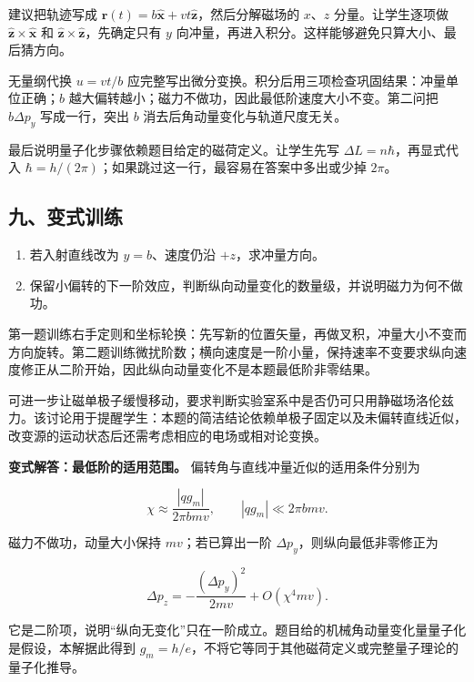 \documentclass[12pt,a4paper,UTF8]{ctexart}
\newcommand{\tightlist}{\setlength{\itemsep}{0pt}\setlength{\parskip}{0pt}}
\begin{document}
建议把轨迹写成
\(\boldsymbol r(t)=b\hat{\boldsymbol x}+vt\hat{\boldsymbol z}\)，然后分解磁场的
\(x\)、\(z\) 分量。让学生逐项做
\(\hat{\boldsymbol z}\times\hat{\boldsymbol x}\) 和
\(\hat{\boldsymbol z}\times\hat{\boldsymbol z}\)，先确定只有 \(y\)
向冲量，再进入积分。这样能够避免只算大小、最后猜方向。

无量纲代换 \(u=vt/b\)
应完整写出微分变换。积分后用三项检查巩固结果：冲量单位正确；\(b\)
越大偏转越小；磁力不做功，因此最低阶速度大小不变。第二问把
\(b\Delta p_y\) 写成一行，突出 \(b\) 消去后角动量变化与轨道尺度无关。

最后说明量子化步骤依赖题目给定的磁荷定义。让学生先写
\(\Delta L=n\hbar\)，再显式代入
\(\hbar=h/(2\pi)\)；如果跳过这一行，最容易在答案中多出或少掉 \(2\pi\)。

\subsection{九、变式训练}\label{ux4e5dux53d8ux5f0fux8badux7ec3-7}

\begin{enumerate}
\def\labelenumi{\arabic{enumi}.}
\tightlist
\item
  若入射直线改为 \(y=b\)、速度仍沿 \(+z\)，求冲量方向。
\item
  保留小偏转的下一阶效应，判断纵向动量变化的数量级，并说明磁力为何不做功。
\end{enumerate}

第一题训练右手定则和坐标轮换：先写新的位置矢量，再做叉积，冲量大小不变而方向旋转。第二题训练微扰阶数；横向速度是一阶小量，保持速率不变要求纵向速度修正从二阶开始，因此纵向动量变化不是本题最低阶非零结果。

可进一步让磁单极子缓慢移动，要求判断实验室系中是否仍可只用静磁场洛伦兹力。该讨论用于提醒学生：本题的简洁结论依赖单极子固定以及未偏转直线近似，改变源的运动状态后还需考虑相应的电场或相对论变换。

\textbf{变式解答：最低阶的适用范围。}
偏转角与直线冲量近似的适用条件分别为

\[\chi\approx\frac{|qg_m|}{2\pi bmv},\qquad |qg_m|\ll2\pi bmv.\]

磁力不做功，动量大小保持 \(mv\)；若已算出一阶
\(\Delta p_y\)，则纵向最低非零修正为

\[\Delta p_z=-\frac{(\Delta p_y)^2}{2mv}+O(\chi^4mv).\]

它是二阶项，说明``纵向无变化''只在一阶成立。题目给的机械角动量变化量量子化是假设，本解据此得到
\(g_m=h/e\)，不将它等同于其他磁荷定义或完整量子理论的量子化推导。
\end{document}
